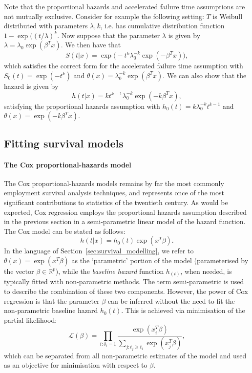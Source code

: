 \documentclass[../thesis.tex]{subfiles}
\begin{document}
Note that the proportional hazards and accelerated failure time assumptions are not mutually exclusive. Consider for example the following setting: $T$ is Weibull distributed with parameters $\lambda, k$, i.e. has cumulative distribution function $1- \exp((t/\lambda)^k$. Now suppose that the parameter $\lambda$ is given by $\lambda = \lambda_0 \exp(\beta^T x)$. We then have that 
\[S(t|x) = \exp\big(-t^k\lambda_0^{-k}\exp( -\beta^Tx)\big), \]
which satisfies the correct form for the accelerated failure time assumption with $S_0(t) = \exp(-t^k)$ and $\theta(x) = \lambda_0^{-k}\exp(\beta^Tx)$. We can also show that the hazard is given by 
\[h(t|x) = kt^{k-1}\lambda_0^{-k} \exp(-k\beta^Tx), \]
satisfying the proportional hazards assumption with $h_0(t) = k\lambda_0^{-k}t^{k-1}$ and $\theta(x) = \exp(-k\beta^Tx)$. 



\subsection{Fitting survival models}

\paragraph{The Cox proportional-hazards model}
The Cox proportional-hazards models \citep{cox_regression_1972} remains by far the most commonly employment survival analysis techniques, and represents once of the most significant contributions to statistics of the twentieth century. As would be expected, Cox regression employs the proportional hazards assumption described in the previous section in a semi-parametric linear model of the hazard function. The Cox model can be stated as follows:
\[h(t|x) = h_0(t) \exp(x^T\beta). \]
In the language of Section~\ref{sec:survival_modelling}, we refer to $\theta(x) = \exp(x^T\beta)$ as the `parametric' portion of the model (parameterised by the vector $\beta \in \mathbb{R}^p$), while the \emph{baseline hazard} function $h_(t)$, when needed, is typically fitted with non-parametric methods. The term semi-parametric is used to describe the combination of these two components. However, the power of Cox regression is that the parameter $\beta$ can be inferred without the need to fit the non-parametric baseline hazard $h_0(t)$. This is achieved via minimisation of the partial likelihood:
\[\mathcal{L}(\beta) = \prod_{i:\delta_i=1} \frac{\exp(x_i^T\beta)}{\sum_{j: t_j \geq t_i}\exp(x_j^T\beta)},\]
which can be separated from all non-parametric estimates of the model and used as an objective for minimisation with respect to $\beta$.
\end{document}
